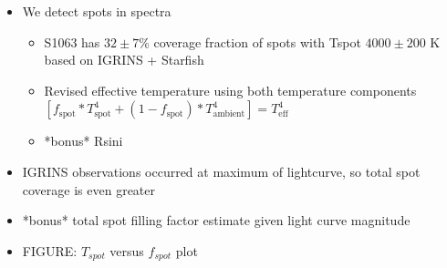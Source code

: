 \documentclass[twocolumn]{emulateapj}%
\begin{document}
\begin{itemize}
\item We detect spots in spectra
\begin{itemize}
  \item S1063 has $32 \pm 7$\% coverage fraction of spots with Tspot $4000\pm200$ K based on IGRINS + Starfish
  \item Revised effective temperature using both temperature components $[f_{\textrm{spot}} * T_{\textrm{spot}}^4 + (1 -f_{\textrm{spot}}) * T_{\textrm{ambient}}^4] = T_{\textrm{eff}}^4$

  \item *bonus* Rsini
\end{itemize}
\item IGRINS observations occurred at maximum of lightcurve, so total spot coverage is even greater
\item *bonus* total spot filling factor estimate given light curve magnitude
\item FIGURE: $T_{spot}$ versus $f_{spot}$ plot



\end{itemize}
\end{document}
